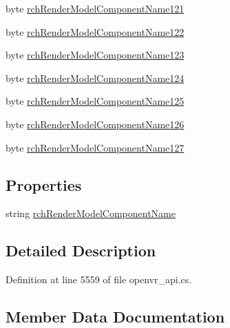 \begin{DoxyCompactItemize}
\item 
byte \mbox{\hyperlink{struct_valve_1_1_v_r_1_1_input_origin_info__t_a4442a623bd1fab3ff594d1f50140e677}{rch\+Render\+Model\+Component\+Name121}}
\item 
byte \mbox{\hyperlink{struct_valve_1_1_v_r_1_1_input_origin_info__t_ac8a4bf792f398bc0d2428ceab5fb2376}{rch\+Render\+Model\+Component\+Name122}}
\item 
byte \mbox{\hyperlink{struct_valve_1_1_v_r_1_1_input_origin_info__t_a5339dfff68f8ad735b2c39f40c4b5728}{rch\+Render\+Model\+Component\+Name123}}
\item 
byte \mbox{\hyperlink{struct_valve_1_1_v_r_1_1_input_origin_info__t_a973190c0ced955bb4f201b74ccb60dce}{rch\+Render\+Model\+Component\+Name124}}
\item 
byte \mbox{\hyperlink{struct_valve_1_1_v_r_1_1_input_origin_info__t_aa2cb04d82f32c759bc6fa8cad4d2eb5e}{rch\+Render\+Model\+Component\+Name125}}
\item 
byte \mbox{\hyperlink{struct_valve_1_1_v_r_1_1_input_origin_info__t_af5329b5ac9628afeab816329838555d4}{rch\+Render\+Model\+Component\+Name126}}
\item 
byte \mbox{\hyperlink{struct_valve_1_1_v_r_1_1_input_origin_info__t_ab0c950b7176b9d231f26e54587b2c137}{rch\+Render\+Model\+Component\+Name127}}
\end{DoxyCompactItemize}
\subsection*{Properties}
\begin{DoxyCompactItemize}
\item 
string \mbox{\hyperlink{struct_valve_1_1_v_r_1_1_input_origin_info__t_a821f8c4e6eb5ff4ad25d99daa2bda844}{rch\+Render\+Model\+Component\+Name}}
\end{DoxyCompactItemize}


\subsection{Detailed Description}


Definition at line 5559 of file openvr\+\_\+api.\+cs.



\subsection{Member Data Documentation}
\mbox{\label{struct_valve_1_1_v_r_1_1_input_origin_info__t_a12cc32a8cf76889f022c046c788f06a2}} 

